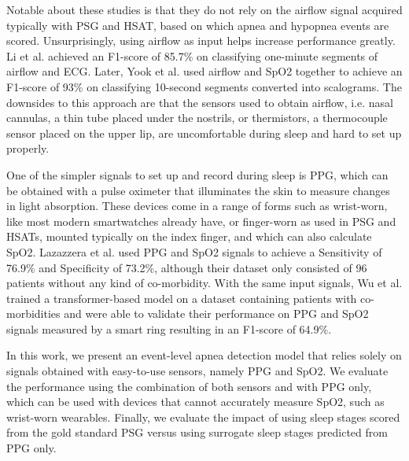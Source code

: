 Notable about these studies is that they do not rely on the airflow signal acquired typically with PSG and HSAT, based on which apnea and hypopnea events are scored. Unsurprisingly, using airflow as input helps increase performance greatly. Li et al. \cite{li2023deep} achieved an F1-score of 85.7\% on classifying one-minute segments of airflow and ECG. Later, Yook et al. \cite{yook2024deep} used airflow and SpO2 together to achieve an F1-score of 93\% on classifying 10-second segments converted into scalograms.
The downsides to this approach are that the sensors used to obtain airflow, i.e. nasal cannulas, a thin tube placed under the nostrils, or thermistors, a thermocouple sensor placed on the upper lip, are uncomfortable during sleep and hard to set up properly.

One of the simpler signals to set up and record during sleep is PPG, which can be obtained with a pulse oximeter that illuminates the skin to measure changes in light absorption.
These devices come in a range of forms such as wrist-worn, like most modern smartwatches already have, or finger-worn as used in PSG and HSATs, mounted typically on the index finger, and which can also calculate SpO2.
Lazazzera et al. \cite {lazazzera2020detection} used PPG and SpO2 signals to achieve a Sensitivity of 76.9\% and Specificity of 73.2\%, although their dataset only consisted of 96 patients without any kind of co-morbidity. With the same input signals, Wu et al. \cite{wu2024transformer} trained a transformer-based model on a dataset containing patients with co-morbidities and were able to validate their performance on PPG and SpO2 signals measured by a smart ring resulting in an F1-score of 64.9\%.

In this work, we present an event-level apnea detection model that relies solely on signals obtained with easy-to-use sensors, namely PPG and SpO2. We evaluate the performance using the combination of both sensors and with PPG only, which can be used with devices that cannot accurately measure SpO2, such as wrist-worn wearables. Finally, we evaluate the impact of using sleep stages scored from the gold standard PSG versus using surrogate sleep stages predicted from PPG only.

